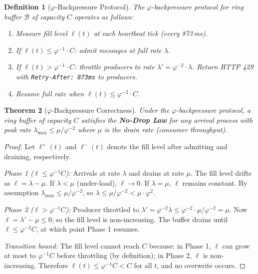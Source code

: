 \documentclass[12pt]{article}
\newtheorem{theorem}{Theorem}
\newtheorem{definition}[theorem]{Definition}
\newcommand{\PHI}{\varphi}
\newcommand{\PHIINV}{\varphi^{-1}}
\newcommand{\AMOR}{\varphi^{-2}}
\newcommand{\Buf}{\mathcal{B}}
\newcommand{\SCAP}{C}
\newcommand{\NoDrop}{\textbf{No-Drop Law}}
\begin{document}
\begin{definition}[$\varphi$-Backpressure Protocol]
\label{def:backpressure}
The \emph{$\varphi$-backpressure protocol} for ring buffer $\Buf$ of capacity
$\SCAP$ operates as follows:
\begin{enumerate}[label=(\arabic*)]
  \item Measure fill level $\ell(t)$ at each heartbeat tick (every 873\,ms).
  \item If $\ell(t) \le \PHIINV \cdot \SCAP$: admit messages at full rate
        $\lambda$.
  \item If $\ell(t) > \PHIINV \cdot \SCAP$: throttle producers to rate
        $\lambda' = \AMOR \cdot \lambda$.  Return HTTP 429 with
        \texttt{Retry-After: 873ms} to producers.
  \item Resume full rate when $\ell(t) \le \AMOR \cdot \SCAP$.
\end{enumerate}
\end{definition}

\begin{theorem}[$\varphi$-Backpressure Correctness]
\label{thm:backpressure}
Under the $\varphi$-backpressure protocol, a ring buffer of capacity $\SCAP$
satisfies the \NoDrop{} for any arrival process with peak rate $\lambda_{\max}
\le \mu / \AMOR$ where $\mu$ is the drain rate (consumer throughput).
\end{theorem}

\begin{proof}
Let $\ell^+(t)$ and $\ell^-(t)$ denote the fill level after admitting and
draining, respectively.

\emph{Phase 1 ($\ell \le \PHIINV \SCAP$):}  Arrivals at rate $\lambda$ and
drains at rate $\mu$.  The fill level drifts as $\dot\ell = \lambda - \mu$.  If
$\lambda < \mu$ (under-load), $\ell \to 0$.  If $\lambda = \mu$, $\ell$ remains
constant.  By assumption $\lambda_{\max} \le \mu/\AMOR$, so $\lambda \le
\mu/\AMOR < \mu \cdot \PHI^2$.

\emph{Phase 2 ($\ell > \PHIINV \SCAP$):}  Producer throttled to $\lambda' =
\AMOR\lambda \le \AMOR \cdot \mu/\AMOR = \mu$.  Now $\dot\ell = \lambda' - \mu
\le 0$, so the fill level is non-increasing.  The buffer drains until $\ell \le
\AMOR \SCAP$, at which point Phase 1 resumes.

\emph{Transition bound:}  The fill level cannot reach $\SCAP$ because: in Phase
1, $\ell$ can grow at most to $\PHIINV \SCAP$ before throttling (by definition);
in Phase 2, $\ell$ is non-increasing.  Therefore $\ell(t) \le \PHIINV \SCAP <
\SCAP$ for all $t$, and no overwrite occurs.
\end{proof}
\end{document}
